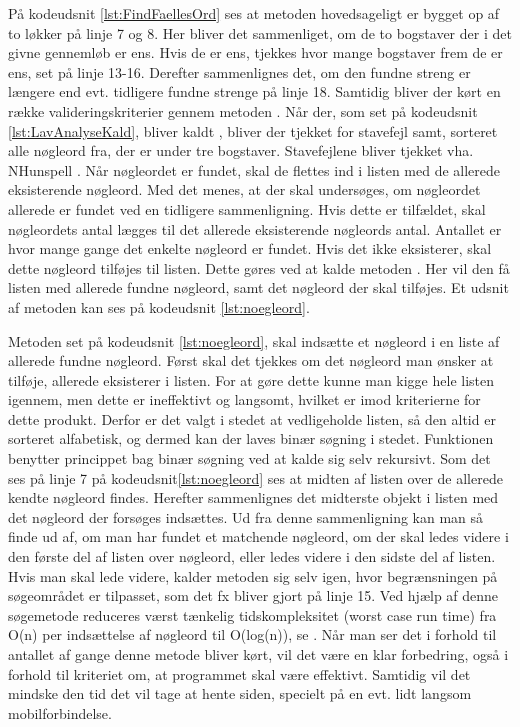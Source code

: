 På kodeudsnit \ref{lst:FindFaellesOrd} ses at metoden hovedsageligt er bygget op af to løkker på linje 7 og 8. Her bliver det sammenliget, om de to bogstaver der i det givne gennemløb er ens. Hvis de er ens, tjekkes hvor mange bogstaver frem de er ens, set på linje 13-16. Derefter sammenlignes det, om den fundne streng er længere end evt. tidligere fundne strenge på linje 18. Samtidig bliver der kørt en række valideringskriterier gennem metoden .
Når der, som set på kodeudsnit \ref{lst:LavAnalyseKald}, bliver kaldt , bliver der tjekket for stavefejl samt, sorteret alle nøgleord fra, der er under tre bogstaver. Stavefejlene bliver tjekket vha. NHunspell \citep{nhunspell}.
Når nøgleordet er fundet, skal de flettes ind i listen med de allerede eksisterende nøgleord. Med det menes, at der skal undersøges, om nøgleordet allerede er fundet ved en tidligere sammenligning. Hvis dette er tilfældet, skal nøgleordets antal lægges til det allerede eksisterende nøgleords antal. Antallet er hvor mange gange det enkelte nøgleord er fundet. Hvis det ikke eksisterer, skal dette nøgleord tilføjes til listen. Dette gøres ved at kalde metoden .
Her vil den få listen med allerede fundne nøgleord, samt det nøgleord der skal tilføjes. Et udsnit af metoden kan ses på kodeudsnit \ref{lst:noegleord}.


Metoden set på kodeudsnit \ref{lst:noegleord}, skal indsætte et nøgleord i en liste af allerede fundne nøgleord. Først skal det tjekkes om det nøgleord man ønsker at tilføje, allerede eksisterer i listen. For at gøre dette kunne man kigge hele listen igennem, men dette er ineffektivt og langsomt, hvilket er imod kriterierne for dette produkt. Derfor er det valgt i stedet at vedligeholde listen, så den altid er sorteret alfabetisk, og dermed kan der laves binær søgning i stedet. Funktionen benytter princippet bag binær søgning ved at kalde sig selv rekursivt. Som det ses på linje 7 på kodeudsnit\ref{lst:noegleord} ses at midten af listen over de allerede kendte nøgleord findes. Herefter sammenlignes det midterste objekt i listen med det nøgleord der forsøges indsættes. Ud fra denne sammenligning kan man så finde ud af, om man har fundet et matchende nøgleord, om der skal ledes videre i den første del af listen over nøgleord, eller ledes videre i den sidste del af listen. Hvis man skal lede videre, kalder metoden sig selv igen, hvor begrænsningen på søgeområdet er tilpasset, som det fx bliver gjort på linje 15. Ved hjælp af denne søgemetode reduceres værst tænkelig tidskompleksitet (worst case run time) fra O(n) per indsættelse af nøgleord til O(log(n)), se \citep{IntroAlgo}. Når man ser det i forhold til antallet af gange denne metode bliver kørt, vil det være en klar forbedring, også i forhold til kriteriet om, at programmet skal være effektivt. Samtidig vil det mindske den tid det vil tage at hente siden, specielt på en evt. lidt langsom mobilforbindelse.
